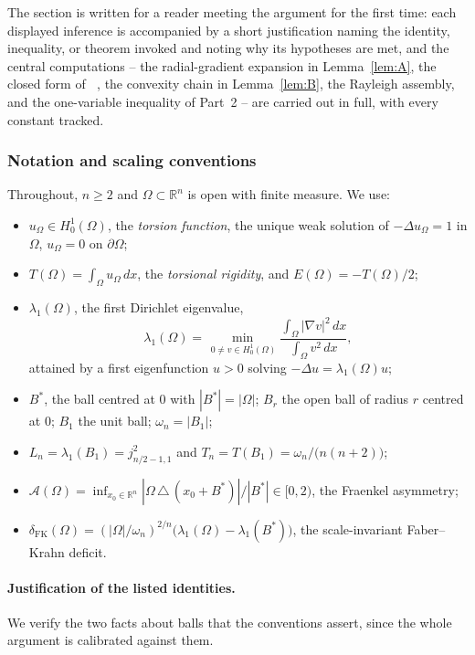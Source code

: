 \documentclass[11pt]{amsart}
\theoremstyle{definition}
\newcommand{\R}{\mathbb R}
\newcommand{\Om}{\Omega}
\newcommand{\Fr}{\mathcal A}
\newcommand{\abs}[1]{\left|#1\right|}
\newcommand{\dx}{\,dx}
\DeclareMathOperator{\Tmod}{T_{\mathrm{mod}}}
\begin{document}
The section is written for a reader meeting the argument for the first
time: each displayed inference is accompanied by a short justification
naming the identity, inequality, or theorem invoked and noting why its
hypotheses are met, and the central computations -- the radial-gradient
expansion in Lemma~\ref{lem:A}, the closed form of $\Tmod$, the convexity
chain in Lemma~\ref{lem:B}, the Rayleigh assembly, and the one-variable
inequality of Part~2 -- are carried out in full, with every constant
tracked.

\subsubsection{Notation and scaling conventions}
\label{ssec:kj-notation}

Throughout, $n\ge 2$ and $\Om\subset\R^n$ is open with finite measure. We
use:
\begin{itemize}
\item $u_\Om\in H^1_0(\Om)$, the \emph{torsion function}, the unique weak
solution of $-\Delta u_\Om=1$ in $\Om$, $u_\Om=0$ on $\partial\Om$;
\item $T(\Om)=\int_\Om u_\Om\dx$, the \emph{torsional rigidity}, and
$E(\Om)=-T(\Om)/2$;
\item $\lambda_1(\Om)$, the first Dirichlet eigenvalue,
\begin{equation}\label{eq:rayleigh}
  \lambda_1(\Om)=\min_{\,0\ne v\in H^1_0(\Om)}
  \frac{\int_\Om\abs{\nabla v}^2\dx}{\int_\Om v^2\dx},
\end{equation}
attained by a first eigenfunction $u>0$ solving $-\Delta u=\lambda_1(\Om)u$;
\item $B^*$, the ball centred at $0$ with $\abs{B^*}=\abs\Om$; $B_r$ the
open ball of radius $r$ centred at $0$; $B_1$ the unit ball;
$\omega_n=\abs{B_1}$;
\item $L_n=\lambda_1(B_1)=j_{n/2-1,1}^2$ and
$T_n=T(B_1)=\omega_n/\bigl(n(n+2)\bigr)$;
\item $\Fr(\Om)=\inf_{x_0\in\R^n}\abs{\Om\,\triangle\,(x_0+B^*)}/\abs{B^*}
\in[0,2)$, the Fraenkel asymmetry;
\item $\delta_{\mathrm{FK}}(\Om)
=(\abs\Om/\omega_n)^{2/n}\bigl(\lambda_1(\Om)-\lambda_1(B^*)\bigr)$, the
scale-invariant Faber--Krahn deficit.
\end{itemize}

\paragraph{Justification of the listed identities.}
We verify the two facts about balls that the conventions assert, since the
whole argument is calibrated against them.
\end{document}

